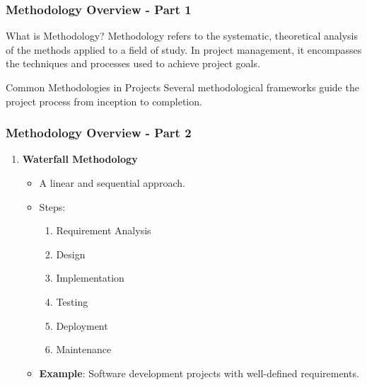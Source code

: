 \documentclass[aspectratio=169]{beamer}
\begin{document}
\begin{frame}[fragile]
    \frametitle{Methodology Overview - Part 1}
    \begin{block}{What is Methodology?}
        Methodology refers to the systematic, theoretical analysis of the methods applied to a field of study. In project management, it encompasses the techniques and processes used to achieve project goals.
    \end{block}
    
    \begin{block}{Common Methodologies in Projects}
        Several methodological frameworks guide the project process from inception to completion.
    \end{block}
\end{frame}

\begin{frame}[fragile]
    \frametitle{Methodology Overview - Part 2}
    \begin{enumerate}
        \item \textbf{Waterfall Methodology}
            \begin{itemize}
                \item A linear and sequential approach.
                \item Steps:
                    \begin{enumerate}
                        \item Requirement Analysis
                        \item Design
                        \item Implementation
                        \item Testing
                        \item Deployment
                        \item Maintenance
                    \end{enumerate}
                \item \textbf{Example}: Software development projects with well-defined requirements.
            \end{itemize}


\end{enumerate}
\end{frame}
\end{document}
